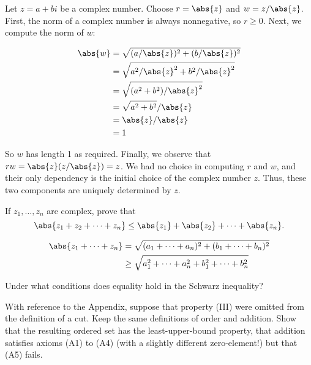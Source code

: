 \documentclass{zupan}
\begin{document}
\begin{solution}
  Let $z = a + bi$ be a complex number. Choose $r = \abs{z}$ and $w =
  z/\abs{z}$. First, the norm of a complex number is always nonnegative, so $r
  \geq 0$. Next, we compute the norm of $w$:

  \[
    \begin{aligned}
      \abs{w}
        & = \sqrt{(a/\abs{z})^2 + (b/\abs{z})^2} \\
        & = \sqrt{a^2/\abs{z}^2 + b^2/\abs{z}^2} \\
        & = \sqrt{(a^2 + b^2)/\abs{z}^2} \\
        & = \sqrt{a^2 + b^2}/\abs{z} \\
        & = \abs{z}/\abs{z} \\
        & = 1 \\
    \end{aligned}
  \]

  So $w$ has length 1 as required. Finally, we observe that $rw =
  \abs{z}(z/\abs{z}) = z$. We had no choice in computing $r$ and $w$, and their
  only dependency is the initial choice of the complex number $z$. Thus, these
  two components are uniquely determined by $z$.
\end{solution}

\begin{exercise}{12}
  If $z_1, \dots, z_n$ are complex, prove that \[\abs{z_1 + z_2 + \cdots + z_n}
  \leq \abs{z_1} + \abs{z_2} + \cdots + \abs{z_n}.\]
\end{exercise}

\begin{solution}
  \[
    \begin{aligned}
      \abs{z_1 + \cdots + z_n}
        & = \sqrt{(a_1 + \cdots + a_n)^2 + (b_1 + \cdots + b_n)^2} \\
        & \geq \sqrt{a_1^2 + \cdots + a_n^2 + b_1^2 + \cdots + b_n^2} \\
    \end{aligned}
  \]
\end{solution}

\begin{exercise}{15}
  Under what conditions does equality hold in the Schwarz inequality?
\end{exercise}

\begin{exercise}{20}
  With reference to the Appendix, suppose that property (III) were omitted from
  the definition of a cut. Keep the same definitions of order and addition.
  Show that the resulting ordered set has the least-upper-bound property, that
  addition satisfies axioms (A1) to (A4) (with a slightly different
  zero-element!) but that (A5) fails.
\end{exercise}

\begin{solution}

\end{solution}
\end{document}
